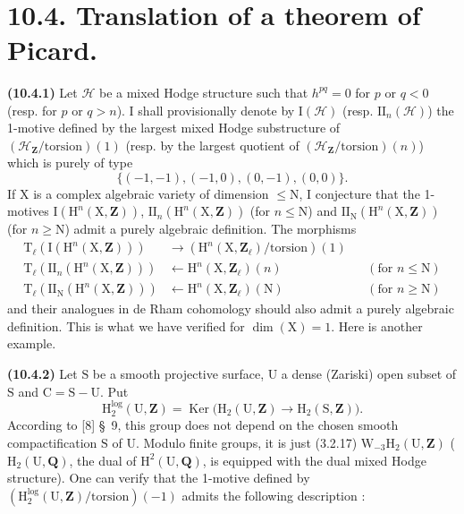 \documentclass[11pt,leqno]{article}
\newcommand{\Page}[1]{\ifvmode\noindent\else\unskip\ \fi{\footnotesize\textcolor{gray}{[p.\,#1]}}\ \ignorespaces}
\begin{document}
\Page{75}
\section*{10.4. Translation of a theorem of Picard.}

\textbf{(10.4.1)} Let \(\mathcal{H}\) be a mixed Hodge structure such that \(h^{pq}=0\) for \(p\) or \(q<0\) (resp. for \(p\) or \(q>n\)). I shall provisionally denote by \(\mathrm{I}(\mathcal{H})\) (resp. \(\mathrm{II}_n(\mathcal{H})\)) the 1-motive defined by the largest mixed Hodge substructure of \((\mathcal{H}_{\mathbf{Z}}/\mathrm{torsion})(1)\) (resp. by the largest quotient of \((\mathcal{H}_{\mathbf{Z}}/\mathrm{torsion})(n)\))  which is purely of type
\[
\{(-1,-1),(-1,0),(0,-1),(0,0)\}.
\]
If \(\mathrm{X}\) is a complex algebraic variety of dimension \(\leq\mathrm{N}\), I conjecture that the 1-motives \(\mathrm{I}(\mathrm{H}^{n}(\mathrm{X},\mathbf{Z}))\), \(\mathrm{II}_n(\mathrm{H}^{n}(\mathrm{X},\mathbf{Z}))\) (for \(n\leq\mathrm{N}\)) and \(\mathrm{II}_{\mathrm{N}}(\mathrm{H}^{n}(\mathrm{X},\mathbf{Z}))\) (for \(n\geq\mathrm{N}\)) admit a purely algebraic definition. The morphisms
\[
\begin{aligned}
\mathrm{T}_{\ell}(\mathrm{I}(\mathrm{H}^{n}(\mathrm{X},\mathbf{Z})))
 &\longrightarrow
 (\mathrm{H}^{n}(\mathrm{X},\mathbf{Z}_{\ell})/\mathrm{torsion})(1)\\
\mathrm{T}_{\ell}(\mathrm{II}_n(\mathrm{H}^{n}(\mathrm{X},\mathbf{Z})))
 &\longleftarrow
 \mathrm{H}^{n}(\mathrm{X},\mathbf{Z}_{\ell})(n)
 &&(\text{for }n\leq\mathrm{N})\\
\mathrm{T}_{\ell}(\mathrm{II}_{\mathrm{N}}(\mathrm{H}^{n}(\mathrm{X},\mathbf{Z})))
 &\longleftarrow
 \mathrm{H}^{n}(\mathrm{X},\mathbf{Z}_{\ell})(\mathrm{N})
 &&(\text{for }n\geq\mathrm{N})
\end{aligned}
\]
and their analogues in de Rham cohomology should also admit a purely algebraic definition. This is what we have verified for \(\dim(\mathrm{X})=1\). Here is another example.

\textbf{(10.4.2)} Let \(\mathrm{S}\) be a smooth projective surface, \(\mathrm{U}\) a dense (Zariski) open subset of \(\mathrm{S}\) and \(\mathrm{C}=\mathrm{S}-\mathrm{U}\). Put
\[
\mathrm{H}^{\log}_{2}(\mathrm{U},\mathbf{Z})
=\operatorname{Ker}\bigl(
\mathrm{H}_{2}(\mathrm{U},\mathbf{Z})
\to\mathrm{H}_{2}(\mathrm{S},\mathbf{Z})\bigr).
\]
According to [8] \S~9, this group does not depend on the chosen smooth compactification \(\mathrm{S}\) of \(\mathrm{U}\). Modulo finite groups, it is just (3.2.17) \(\mathrm{W}_{-3}\mathrm{H}_{2}(\mathrm{U},\mathbf{Z})\) (\(\mathrm{H}_{2}(\mathrm{U},\mathbf{Q})\), the dual of \(\mathrm{H}^{2}(\mathrm{U},\mathbf{Q})\), is equipped with the dual mixed Hodge structure). One can verify that the 1-motive defined by \((\mathrm{H}^{\log}_{2}(\mathrm{U},\mathbf{Z})/\mathrm{torsion})(-1)\) admits the following description :
\end{document}
